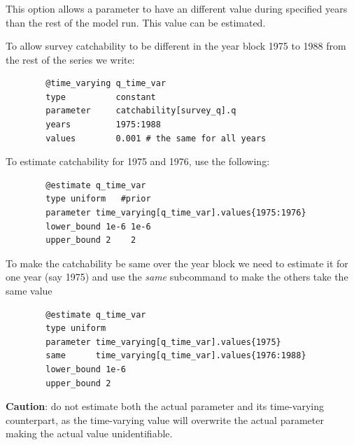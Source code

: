 \subsubsection[Constant (year blocks)]{}\label{sec:TimeVarying-Constant}

This option allows a parameter to have an different value during specified years than the rest of the model run. This value can be estimated.

To allow survey catchability to be different in the year block 1975 to 1988 from the rest of the series we write:

{\small{\begin{verbatim}
		@time_varying q_time_var
		type          constant
		parameter     catchability[survey_q].q
		years         1975:1988
		values        0.001 # the same for all years
		\end{verbatim}}}

To estimate catchability for 1975 and 1976, use the following:

{\small{\begin{verbatim}
		@estimate q_time_var
		type uniform   #prior
		parameter time_varying[q_time_var].values{1975:1976}
		lower_bound 1e-6 1e-6
		upper_bound 2    2
		\end{verbatim}}}

To make the catchability be same over the year block we need to estimate it for one year (say 1975) and use the \textit{same} subcommand to make the others take the same value

{\small{\begin{verbatim}
		@estimate q_time_var
		type uniform
		parameter time_varying[q_time_var].values{1975}
		same      time_varying[q_time_var].values{1976:1988}
		lower_bound 1e-6
		upper_bound 2
		\end{verbatim}}}

\textbf{Caution}: do not estimate both the actual parameter and its time-varying counterpart, as the time-varying value will overwrite the actual parameter making the actual value unidentifiable. 

\subsubsection[Linear]{}\label{sec:TimeVarying-Linear}

